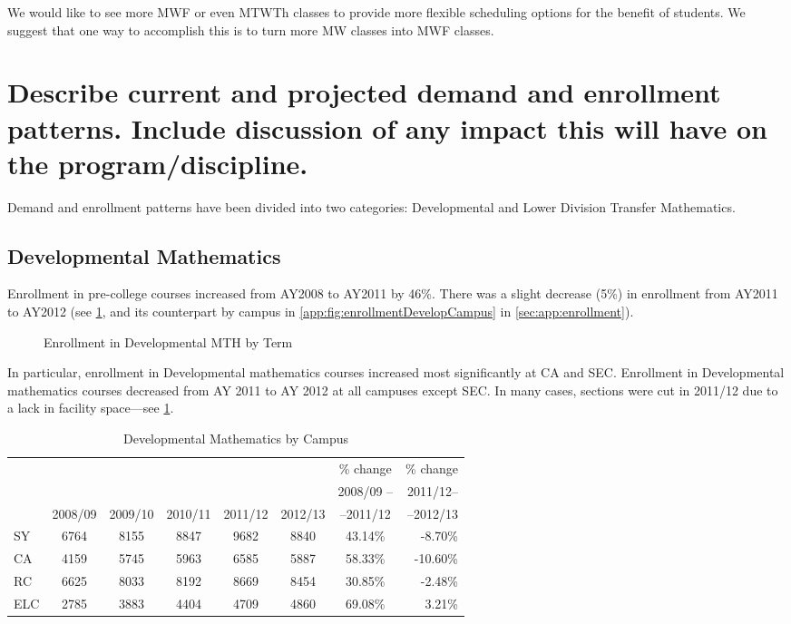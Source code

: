 We would like to see more MWF or even MTWTh classes to provide more flexible
scheduling options for the benefit of students. We suggest that one way to
accomplish this is to turn more MW classes into MWF classes.

\section{Describe current and projected demand and enrollment patterns.
  Include discussion of any impact this will have on the program/discipline.
}
Demand and enrollment patterns have been divided into two categories:
Developmental and Lower Division Transfer Mathematics.

\subsection{Developmental Mathematics}
Enrollment in pre-college courses increased from AY2008 to AY2011 by 46\%.
There was a slight decrease (5\%) in enrollment from AY2011 to AY2012 (see
\cref{needs:fig:enrollmentDevelopTerm}, and its counterpart by campus in
\vref{app:fig:enrollmentDevelopCampus} in \cref{sec:app:enrollment}).

\begin{figure}[!htb]
	\centering
	
	\caption{Enrollment in Developmental MTH by Term}
	\label{needs:fig:enrollmentDevelopTerm}
\end{figure}

In particular, enrollment in Developmental mathematics courses increased most
significantly at CA and SEC. Enrollment in Developmental mathematics courses
decreased from AY 2011 to AY 2012 at all campuses except SEC. In many cases,
sections were cut in 2011/12 due to a lack in facility space---see
\cref{needs:tab:enrollmentDevelp}. 


\begin{table}[!htb]
	\caption{Developmental Mathematics by Campus}
	\label{needs:tab:enrollmentDevelp}
	\begin{tabular}{l*{6}{c}r}
		\toprule
		    &        &        &        &        &        & \% change & \% change \\
		    &		&	&	&	&	&2008/09 --	&2011/12--\\
		    & 2008/09 & 2009/10 & 2010/11 & 2011/12 & 2012/13 & --2011/12 &--2012/13 \\
		\midrule
		SY  & 6764   & 8155   & 8847   & 9682   & 8840   & 43.14\%   & -8.70\%   \\
		CA  & 4159   & 5745   & 5963   & 6585   & 5887   & 58.33\%   & -10.60\%  \\
		RC  & 6625   & 8033   & 8192   & 8669   & 8454   & 30.85\%   & -2.48\%   \\
		ELC & 2785   & 3883   & 4404   & 4709   & 4860   & 69.08\%   & 3.21\%    \\
		\bottomrule
	\end{tabular}
\end{table}

